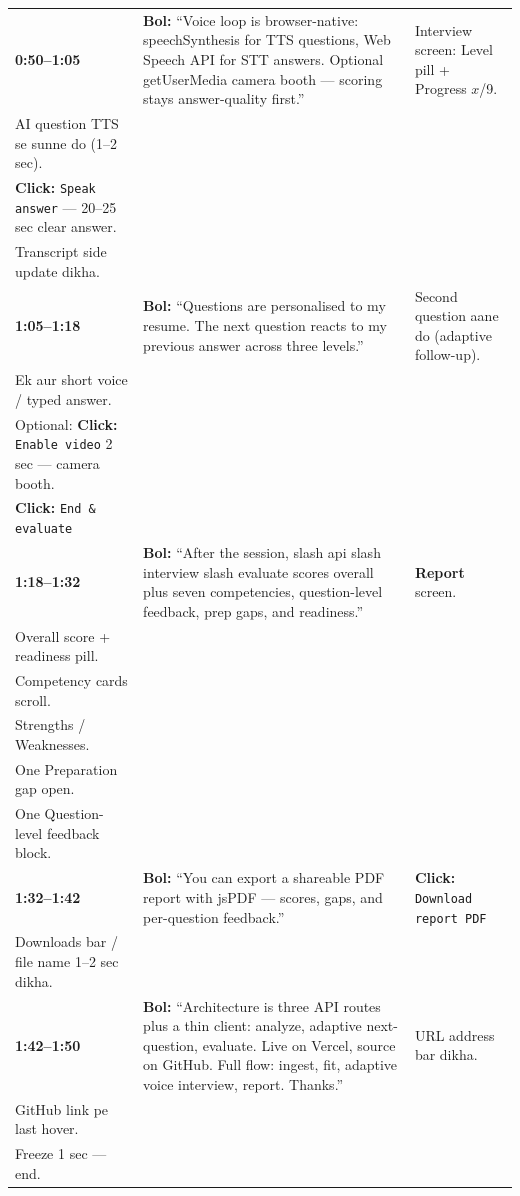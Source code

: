 \documentclass[11pt,a4paper]{article}
\newcommand{\sayline}[1]{\textbf{Bol:} ``#1''}
\newcommand{\click}[1]{\textbf{Click:} \texttt{#1}}
\begin{document}
\begin{longtable}{@{}>{\raggedright\arraybackslash}p{1.5cm}>{\raggedright\arraybackslash}p{6.6cm}>{\raggedright\arraybackslash}p{6.2cm}@{}}
\textbf{0:50--1:05}
&
\sayline{Voice loop is browser-native: speechSynthesis for TTS questions, Web Speech API for STT answers. Optional getUserMedia camera booth --- scoring stays answer-quality first.}
&
Interview screen: Level pill + Progress $x$/9.\\
AI question TTS se sunne do (1--2 sec).\\
\click{Speak answer} --- 20--25 sec clear answer.\\
Transcript side update dikha.\\
\midrule

\textbf{1:05--1:18}
&
\sayline{Questions are personalised to my resume. The next question reacts to my previous answer across three levels.}
&
Second question aane do (adaptive follow-up).\\
Ek aur short voice / typed answer.\\
Optional: \click{Enable video} 2 sec --- camera booth.\\
\click{End \& evaluate}\\
\midrule

\textbf{1:18--1:32}
&
\sayline{After the session, slash api slash interview slash evaluate scores overall plus seven competencies, question-level feedback, prep gaps, and readiness.}
&
\textbf{Report} screen.\\
Overall score + readiness pill.\\
Competency cards scroll.\\
Strengths / Weaknesses.\\
One Preparation gap open.\\
One Question-level feedback block.\\
\midrule

\textbf{1:32--1:42}
&
\sayline{You can export a shareable PDF report with jsPDF --- scores, gaps, and per-question feedback.}
&
\click{Download report PDF}\\
Downloads bar / file name 1--2 sec dikha.\\
\midrule

\textbf{1:42--1:50}
&
\sayline{Architecture is three API routes plus a thin client: analyze, adaptive next-question, evaluate. Live on Vercel, source on GitHub. Full flow: ingest, fit, adaptive voice interview, report. Thanks.}
&
URL address bar dikha.\\
GitHub link pe last hover.\\
Freeze 1 sec --- end.
\\
\bottomrule
\end{longtable}
\end{document}
